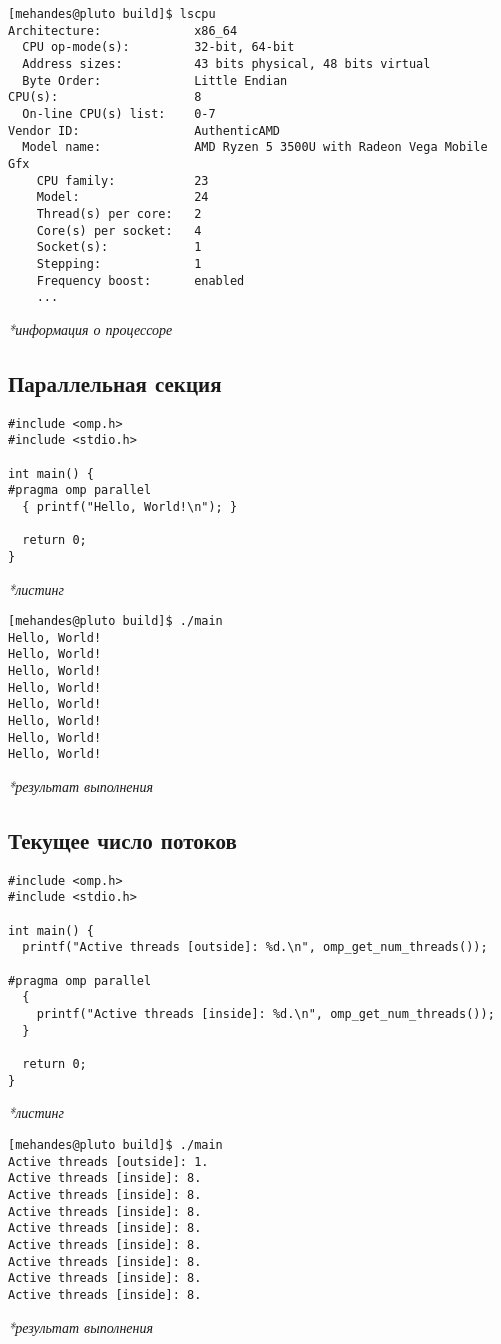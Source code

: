\documentclass[12pt, a4paper]{article}
\begin{document}
\begin{verbatim}
[mehandes@pluto build]$ lscpu
Architecture:             x86_64
  CPU op-mode(s):         32-bit, 64-bit
  Address sizes:          43 bits physical, 48 bits virtual
  Byte Order:             Little Endian
CPU(s):                   8
  On-line CPU(s) list:    0-7
Vendor ID:                AuthenticAMD
  Model name:             AMD Ryzen 5 3500U with Radeon Vega Mobile Gfx
    CPU family:           23
    Model:                24
    Thread(s) per core:   2
    Core(s) per socket:   4
    Socket(s):            1
    Stepping:             1
    Frequency boost:      enabled
    ...
\end{verbatim}
\textit{*информация о процессоре}

\subsection{Параллельная секция}

\begin{verbatim}
#include <omp.h>
#include <stdio.h>

int main() {
#pragma omp parallel
  { printf("Hello, World!\n"); }

  return 0;
}
\end{verbatim}
\textit{*листинг}

\begin{verbatim}
[mehandes@pluto build]$ ./main
Hello, World!
Hello, World!
Hello, World!
Hello, World!
Hello, World!
Hello, World!
Hello, World!
Hello, World!
\end{verbatim}
\textit{*результат выполнения}

\subsection{Текущее число потоков}

\begin{verbatim}
#include <omp.h>
#include <stdio.h>

int main() {
  printf("Active threads [outside]: %d.\n", omp_get_num_threads());

#pragma omp parallel
  {
    printf("Active threads [inside]: %d.\n", omp_get_num_threads());
  }

  return 0;
}
\end{verbatim}
\textit{*листинг}

\begin{verbatim}
[mehandes@pluto build]$ ./main
Active threads [outside]: 1.
Active threads [inside]: 8.
Active threads [inside]: 8.
Active threads [inside]: 8.
Active threads [inside]: 8.
Active threads [inside]: 8.
Active threads [inside]: 8.
Active threads [inside]: 8.
Active threads [inside]: 8.
\end{verbatim}
\textit{*результат выполнения}
\end{document}
